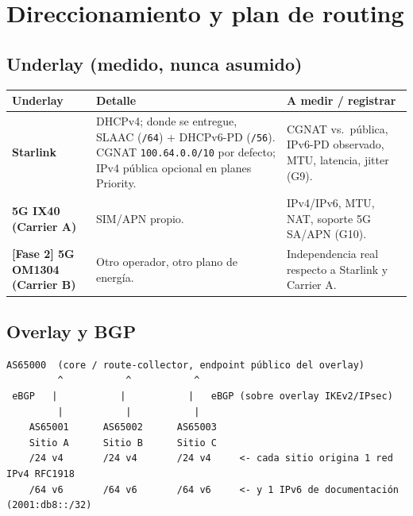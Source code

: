 \documentclass[11pt,a4paper]{article}
\newcommand{\hcell}[1]{\textbf{#1}}
\begin{document}
\section{Direccionamiento y plan de routing}

\subsection{Underlay (medido, nunca asumido)}

\begin{tabularx}{\linewidth}{@{}>{\bfseries}p{2.8cm}X>{\raggedright\arraybackslash}p{4.8cm}@{}}
\toprule
\hcell{Underlay} & \hcell{Detalle} & \hcell{A medir / registrar} \\
\midrule
Starlink &
  DHCPv4; donde se entregue, SLAAC (\texttt{/64}) + DHCPv6-PD (\texttt{/56}).
  CGNAT \texttt{100.64.0.0/10} por defecto; IPv4 pública opcional en planes Priority. &
  CGNAT vs.\ pública, IPv6-PD observado, MTU, latencia, jitter (G9). \\
5G IX40 (Carrier A) &
  SIM/APN propio. &
  IPv4/IPv6, MTU, NAT, soporte 5G SA/APN (G10). \\
{[Fase 2]} 5G OM1304 (Carrier B) &
  Otro operador, otro plano de energía. &
  Independencia real respecto a Starlink y Carrier A. \\
\bottomrule
\end{tabularx}

\subsection{Overlay y BGP}

\begin{diagbox}
\begin{Verbatim}[fontsize=\footnotesize]
      AS65000  (core / route-collector, endpoint público del overlay)
         ^           ^           ^
 eBGP   |           |           |   eBGP (sobre overlay IKEv2/IPsec)
         |           |           |
    AS65001      AS65002      AS65003
    Sitio A      Sitio B      Sitio C
    /24 v4       /24 v4       /24 v4     <- cada sitio origina 1 red IPv4 RFC1918
    /64 v6       /64 v6       /64 v6     <- y 1 IPv6 de documentación (2001:db8::/32)
\end{Verbatim}
\end{diagbox}
\end{document}
